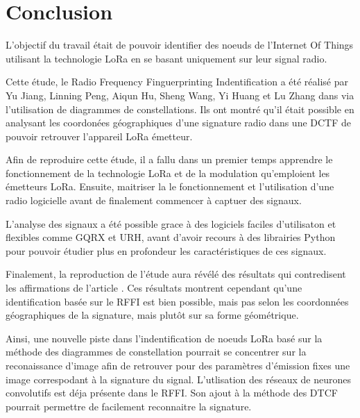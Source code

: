 \chapter*{Conclusion}
\renewcommand{\leftmark}{CONCLUSION}

L'objectif du travail était de pouvoir identifier des noeuds de l'Internet Of Things utilisant la technologie LoRa en se basant uniquement sur leur signal radio.

\vspace{0.1cm}

Cette étude, le Radio Frequency Finguerprinting Indentification a été réalisé par Yu Jiang, Linning Peng, Aiqun Hu, Sheng Wang, Yi Huang et Lu Zhang dans \cite{loraDCTF} via l'utilisation de diagrammes de constellations. Ils ont montré qu'il était possible en analysant les coordonées géographiques d'une signature radio dans une DCTF de pouvoir retrouver l'appareil LoRa émetteur.

\vspace{0.1cm}

Afin de reproduire cette étude, il a fallu dans un premier temps apprendre le fonctionnement de la technologie LoRa et  de la modulation qu'emploient les émetteurs LoRa. Ensuite, maitriser la le fonctionnement et l'utilisation d'une radio logicielle avant de finalement commencer à captuer des signaux.

\vspace{0.1cm}

L'analyse des signaux a été possible grace à des logiciels faciles d'utilisaton et flexibles comme GQRX et URH, avant d'avoir recours à des librairies Python pour pouvoir étudier plus en profondeur les caractéristiques de ces signaux.

\vspace{0.1cm}

Finalement, la reproduction de l'étude aura révélé des résultats qui contredisent les affirmations de l'article \cite{loraDCTF}. Ces résultats montrent cependant qu'une identification basée sur le RFFI est bien possible, mais pas selon les coordonnées géographiques de la signature, mais plutôt sur sa forme géométrique.

\vspace{0.1cm}

Ainsi, une nouvelle piste dans l'indentification de noeuds LoRa basé sur la méthode des diagrammes de constellation pourrait se concentrer sur la reconaissance d'image afin de retrouver pour des paramètres d'émission fixes une image correspodant à la signature du signal. L'utlisation des réseaux de neurones convolutifs est déja présente dans le RFFI. Son ajout à la méthode des DTCF pourrait permettre de facilement reconnaitre la signature.